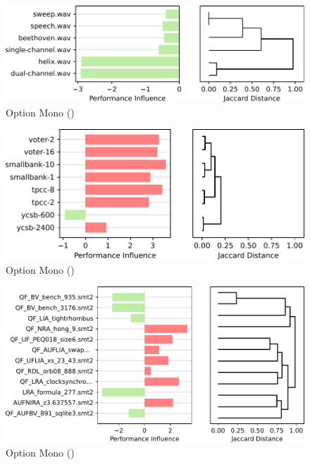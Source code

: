 {{{\vspace{1mm}




}
\begin{figure}
	\includegraphics[width=0.999\linewidth]{rq23/Mono.pdf}
	\caption{Option \textsf{Mono} (\jumper)}
	\label{fig:results2}
\end{figure}


\begin{figure}
	\includegraphics[width=0.999\linewidth]{rq23/MVSTORE.pdf}
	\caption{Option \textsf{Mono} (\jumper)}
	\label{fig:results2}
\end{figure}

\begin{figure}
	\includegraphics[width=0.999\linewidth]{rq23/proof.pdf}
	\caption{Option \textsf{Mono} (\jumper)}
	\label{fig:results2}
\end{figure}

}}
